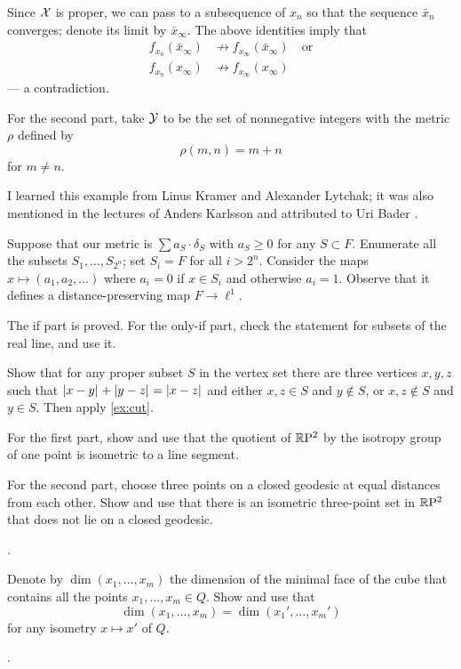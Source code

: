 Since $\mathcal{X}$ is proper, we can pass to a subsequence of $x_n$ so that the sequence  $\bar x_n$ converges;
denote its limit by $\bar x_\infty$.
The above identities imply that
\begin{align*}
f_{x_n}(\bar x_\infty)&\not\to f_{x_\infty}(\bar x_\infty)
\quad
\text{or}
\\
f_{x_n}(x_\infty)&\not\to f_{x_\infty}( x_\infty)
\end{align*}
--- a contradiction.

For the second part, take $\mathcal{Y}$ to be the set of nonnegative integers with the metric $\rho$ defined by
\[\rho(m,n)=m+n\] 
for $m\ne n$.

\medskip

I learned this example from Linus Kramer and Alexander Lytchak;
it was also mentioned in the lectures of Anders Karlsson
and attributed to Uri Bader \cite[2.3]{karlsson}.

Suppose that our metric is $\sum a_S\cdot\delta_S$ with $a_S\ge 0$ for any $S\subset F$.
Enumerate all the subsets $S_1,\dots,S_{2^n}$;
set $S_i=F$ for all $i>2^n$. 
Consider the maps $x\mapsto (a_1,a_2,\dots)$ where $a_i=0$ if $x\in S_i$ and otherwise $a_i=1$.
Observe that it defines a distance-preserving map $F\to \ell^1$. 

The if part is proved.
For the only-if part, check the statement for subsets of the real line, and use it.

Show that for any proper subset $S$ in the vertex set there are three vertices $x,y,z$ such that $\dist{x}{y}{} +\dist{y}{z}{}=\dist{x}{z}{}$ and either 
$x,z\in S$ and $y\notin S$, or $x,z\notin S$ and $y\in S$.
Then apply \ref{ex:cut}.

For the first part, show and use that the quotient of $\mathbb{R}\mathrm{P}^2$ by the isotropy group of one point is isometric to a line segment.

For the second part, choose three points on a closed geodesic at equal distances from each other.
Show and use that there is an isometric three-point set in $\mathbb{R}\mathrm{P}^2$ that does not lie on a closed geodesic.

 \cite[V \S 2]{busemann-1942}.

Denote by $\dim(x_1,\dots,x_m)$ the dimension of the minimal face of the cube that contains all the points $x_1,\dots,x_m\in Q$.
Show and use that 
\[\dim(x_1,\dots,x_m)=\dim(x_1',\dots,x_m')\]
for any isometry $x\mapsto x'$ of $Q$.

 \cite[prop. 6 and 7]{berestovskii-nikonorov}.
